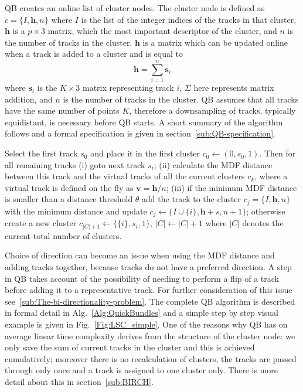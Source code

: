 \documentclass[preprint,authoryear,a4paper,10pt,onecolumn]{elsarticle}
\begin{document}
QB creates an online list of cluster nodes. The cluster node is defined
as $c=\{I,\mathbf{h},n\}$ where $I$ is the list of the integer indices
of the tracks in that cluster, $\mathbf{h}$ is a $p\times3$ matrix,
which the most important descriptor of the cluster, and $n$ is the
number of tracks in the cluster. $\mathbf{h}$ is a matrix which can be
updated online when a track is added to a cluster and is equal to
\begin{equation}
  \mathbf{h}=\sum_{i=1}^{n}\mathbf{s}_{i}
\end{equation} 
where $\mathbf{s}_{i}$ is the $K\times3$ matrix representing track $i$,
$\Sigma$ here represents matrix addition, and $n$ is the number of
tracks in the cluster. QB assumes that all tracks have the same number
of points $K$, therefore a downsampling of tracks, typically
equidistant, is necessary before QB starts. A short summary of the
algorithm follows and a formal specification is given in
section~\ref{sub:QB-specification}.

Select the first track $s_{0}$ and place it in the first cluster
$c_{0}\leftarrow({0},s_{0},1)$. Then for all remaining tracks (i) goto
next track $s_{i}$; (ii) calculate the MDF distance between this track and
the virtual tracks of all the current clusters $c_{k}$, where a virtual track
is defined on the fly as $\mathbf{v}=\mathbf{h}/n$; (iii) if the minimum
MDF distance is smaller than a distance threshold
$\theta$ add the track to the cluster
$c_{j}=\{I,\mathbf{h},n\}$ with the minimum distance and update
$c_{j}\leftarrow\{I\cup\{i\},\mathbf{h}+s,n+1\}$; otherwise create a new
cluster $c_{|C|+1}\leftarrow\{\{i\},s_{i},1\}$, $|C|\leftarrow|C|+1$ where
$|C|$ denotes the current total number of clusters. 

Choice of direction can become an issue when using the MDF distance and
adding tracks together, because tracks do not have a preferred
direction.  A step in QB takes account of the possibility of needing to
perform a flip of a track before adding it to a representative
track. For further consideration of this issue
see~\ref{sub:The-bi-directionality-problem}. The complete QB algorithm
is described in formal detail in Alg.~\ref{Alg:QuickBundles} and a
simple step by step visual example is given in
Fig.~\ref{Fig:LSC_simple}.  One of the reasons why QB has on average
linear time complexity derives from the structure of the cluster node:
we only save the sum of current tracks in the cluster and this is
achieved cumulatively; moreover there is no recalculation of clusters,
the tracks are passed through only once and a track is assigned to one
cluster only. There is more detail about this in
section~\ref{sub:BIRCH}.
\end{document}
